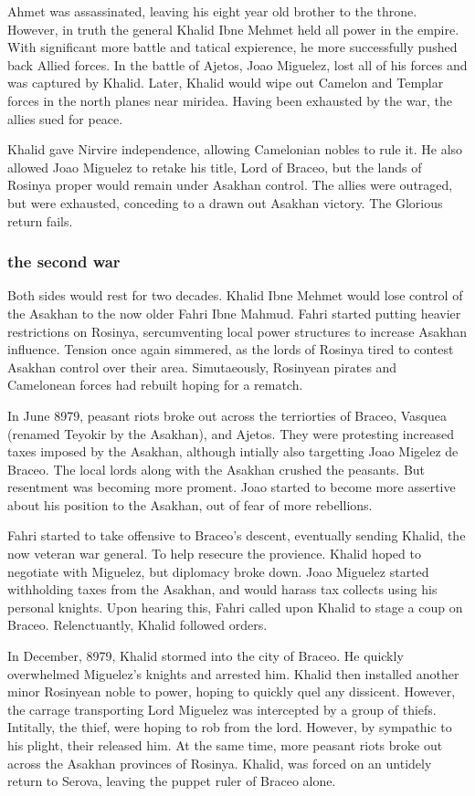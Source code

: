 \documentclass[../main.tex]{subfiles}
\begin{document}
Ahmet was assassinated, leaving his eight year old brother to the throne. However, in truth the general 
Khalid Ibne Mehmet held all power in the empire. With significant more battle and tatical expierence, he
more successfully pushed back Allied forces. In the battle of Ajetos, Joao Miguelez, lost all of his forces 
and was captured by Khalid. Later, Khalid would wipe out Camelon and Templar forces in the north planes 
near miridea. Having been exhausted by the war, the allies sued for peace.

Khalid gave Nirvire independence, allowing Camelonian nobles to rule it. He also allowed Joao Miguelez to 
retake his title, Lord of Braceo, but the lands of Rosinya proper would remain under Asakhan control. The 
allies were outraged, but were exhausted, conceding to a drawn out Asakhan victory. The Glorious return fails.

\subsubsection{the second war}
Both sides would rest for two decades. Khalid Ibne Mehmet would lose control of the Asakhan to the now
older Fahri Ibne Mahmud. Fahri started putting heavier restrictions on Rosinya, sercumventing local power
structures to increase Asakhan influence. Tension once again simmered, as the lords of Rosinya tired to 
contest Asakhan control over their area. Simutaeously, Rosinyean pirates and Camelonean forces had rebuilt 
hoping for a rematch. 

In June 8979, peasant riots broke out across the terriorties of Braceo, Vasquea (renamed Teyokir by the Asakhan),
and Ajetos. They were protesting increased taxes imposed by the Asakhan, although intially also targetting Joao 
Migelez de Braceo. The local lords along with the Asakhan crushed the peasants. But resentment was becoming more 
proment. Joao started to become more assertive about his position to the Asakhan, out of fear of more rebellions. 

Fahri started to take offensive to Braceo's descent, eventually sending Khalid, the now veteran war general. To help
resecure the provience. Khalid hoped to negotiate with Miguelez, but diplomacy broke down. Joao Miguelez started 
withholding taxes from the Asakhan, and would harass tax collects using his personal knights. Upon hearing this, 
Fahri called upon Khalid to stage a coup on Braceo. Relenctuantly, Khalid followed orders. 

In December, 8979, Khalid stormed into the city of Braceo. He quickly overwhelmed Miguelez's knights and arrested 
him. Khalid then installed another minor Rosinyean noble to power, hoping to quickly quel any dissicent. However,
the carrage transporting Lord Miguelez was intercepted by a group of thiefs. Intitally, the thief, were hoping to
rob from the lord. However, by sympathic to his plight, their released him. At the same time, more peasant riots 
broke out across the Asakhan provinces of Rosinya. Khalid, was forced on an untidely return to Serova, leaving the
puppet ruler of Braceo alone.
\end{document}
